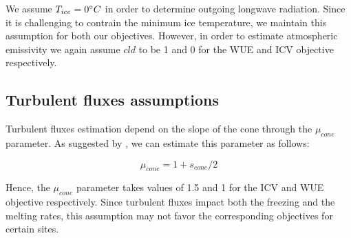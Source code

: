 \documentclass[tc, manuscript]{copernicus}
\begin{document}
We assume $T_{ice} = 0 ^{\circ} C$ in order to determine outgoing longwave radiation. Since it is challenging to
contrain the minimum ice temperature, we maintain this assumption for both our objectives. However, in order to
estimate atmospheric emissivity we again assume $cld$ to be 1 and 0 for the WUE and ICV objective respectively.

\subsection{Turbulent fluxes assumptions} \label{sec:Qs}

Turbulent fluxes estimation depend on the slope of the cone through the $\mu_{cone}$ parameter. As suggested 
by \citet{oerlemansBriefCommunicationGrowth2021}, we can estimate this parameter as follows:

\begin{equation}
  \mu_{cone} =1 + s_{cone}/2
\end{equation}

Hence, the $\mu_{cone}$ parameter takes values of 1.5 and 1 for the ICV and WUE objective respectively.  Since
turbulent fluxes impact both the freezing and the melting rates, this assumption may not favor the corresponding
objectives for certain sites.

\noappendix 



\end{document}
